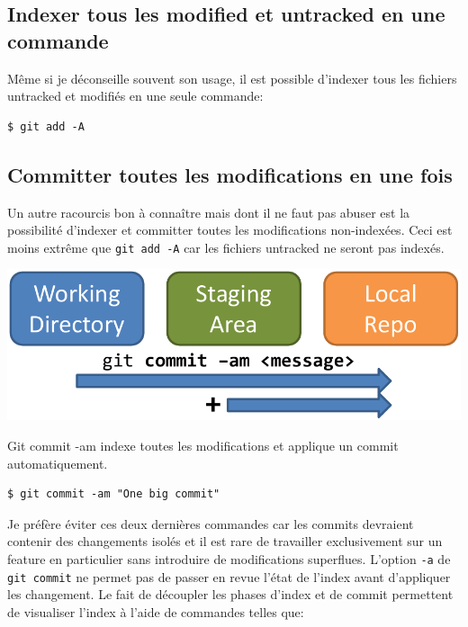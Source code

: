 \documentclass{../../common/tufte-latex/tufte-handout}
\begin{document}
\subsection{Indexer tous les modified et untracked en une commande}

Même si je déconseille souvent son usage, il est possible d'indexer tous les fichiers untracked et modifiés en une seule commande:

\begin{lstlisting}[style=BashInputStyle]
  $ git add -A
\end{lstlisting}

\subsection{Committer toutes les modifications en une fois}

Un autre racourcis bon à connaître mais dont il ne faut pas abuser est la possibilité d'indexer et committer toutes les modifications non-indexées. Ceci est moins extrême que \texttt{git add -A} car les fichiers untracked ne seront pas indexés.

\begin{marginfigure}%
  \centering
  \includegraphics[width=\linewidth]{gitcommit-am-schema.pdf}
  \label{fig:gitcommit-am}
  \caption{Git commit -am indexe toutes les modifications et applique un commit automatiquement.}
\end{marginfigure}
\begin{lstlisting}[style=BashInputStyle]
  $ git commit -am "One big commit"
\end{lstlisting}

Je préfère éviter ces deux dernières commandes car les commits devraient contenir des changements isolés et il est rare de travailler exclusivement sur un feature en particulier sans introduire de modifications superflues.
L'option \texttt{-a} de \texttt{git commit} ne permet pas de passer en revue l'état de l'index avant d'appliquer les changement.
Le fait de découpler les phases d'index et de commit permettent de visualiser l'index à l'aide de commandes telles que:
\end{document}
